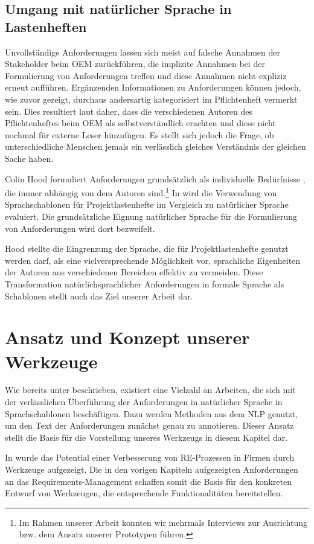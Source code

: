 \documentclass[12pt]{report}
\begin{document}
\subsection{Umgang mit natürlicher Sprache in Lastenheften}
Unvollständige Anforderungen lassen sich meist auf falsche Annahmen der Stakeholder beim OEM zurückführen, die implizite Annahmen bei der Formulierung von Anforderungen treffen und diese Annahmen nicht expliziz erneut aufführen. Ergänzenden Informationen zu Anforderungen können jedoch, wie zuvor gezeigt, durchaus andersartig kategorisiert im Pflichtenheft vermerkt sein. Dies resultiert laut \cite{pr11} daher, dass die verschiedenen Autoren des Pflichtenheftes beim OEM als selbstverständlich erachten und diese nicht nochmal für externe Leser hinzufügen. Es stellt sich jedoch die Frage, ob unterschiedliche Menschen jemals ein verlässlich gleiches Verständnis der gleichen Sache haben. 

Colin Hood formuliert Anforderungen grundsätzlich als \glqq individuelle Bedürfnisse \grq{}, die immer abhängig von dem Autoren sind.\footnote{Im Rahmen unserer Arbeit konnten wir mehrmals Interviews zur Ausrichtung bzw. dem Ansatz unserer Prototypen führen.} In wird die Verwendung von Sprachschablonen für Projektlastenhefte im Vergleich zu natürlicher Sprache evaluiert. Die grundsätzliche Eignung natürlicher Sprache für die Formulierung von Anforderungen wird dort bezweifelt. 

Hood stellte die Eingrenzung der Sprache, die für Projektlastenhefte genutzt werden darf, als eine vielversprechende Möglichkeit vor, sprachliche Eigenheiten der Autoren aus verschiedenen Bereichen effektiv zu vermeiden. Diese Transformation natürlichsprachlicher Anforderungen in formale Sprache als Schablonen stellt auch das Ziel unserer Arbeit dar.


\section{Ansatz und Konzept unserer Werkzeuge}
Wie bereits unter beschrieben, existiert eine Vielzahl an Arbeiten, die sich mit der verlässlichen Überführung der Anforderungen in natürlicher Sprache in Sprachschablonen beschäftigen. Dazu werden Methoden aus dem NLP genutzt, um den Text der Anforderungen zunächst genau zu annotieren. Dieser Ansatz stellt die Basis für die Vorstellung unseres Werkzeugs in diesem Kapitel dar.

In wurde das Potential einer Verbesserung von RE-Prozessen in Firmen durch Werkzeuge aufgezeigt. Die in den vorigen Kapiteln aufgezeigten Anforderungen an das Requirements-Management schaffen somit die Basis für den konkreten Entwurf von Werkzeugen, die entsprechende Funktionalitäten bereitstellen.
\end{document}
